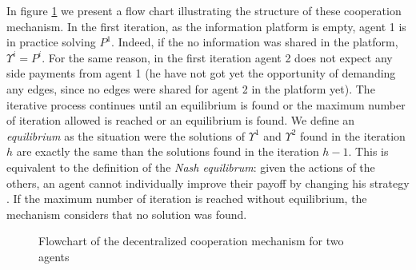 \documentclass[authoryear]{elsarticle}
\begin{document}
In figure \ref{fig:iterflowchart} we present a flow chart illustrating the structure of these cooperation mechanism.
In the first iteration, as the information platform is empty, agent 1 is in practice solving $P^1$. Indeed, if the no information was shared in the platform, $\Upsilon^i=P^i$. For the same reason, in the first iteration agent 2 does not expect any side payments from agent 1 (he have not got yet the opportunity of demanding any edges, since no edges were shared for agent 2 in the platform yet). The iterative process continues until an equilibrium is found or the maximum number of iteration allowed is reached or an equilibrium is found. We define an \emph{equilibrium} as the situation were the solutions of $\Upsilon^1$ and $\Upsilon^2$ found in the iteration $h$ are exactly the same than the solutions found in the iteration $h-1$. This is equivalent to the definition of the \emph{Nash equilibrum}: given the actions of the others, an agent cannot individually improve their payoff by changing his strategy \citep{GONZALEZ2010}. If the maximum number of iteration is reached without equilibrium, the mechanism considers that no solution was found.


\begin{figure}[ht!]
\centering
\caption{Flowchart of the decentralized cooperation mechanism for two agents\label{fig:iterflowchart}}
\end{figure}
\end{document}
